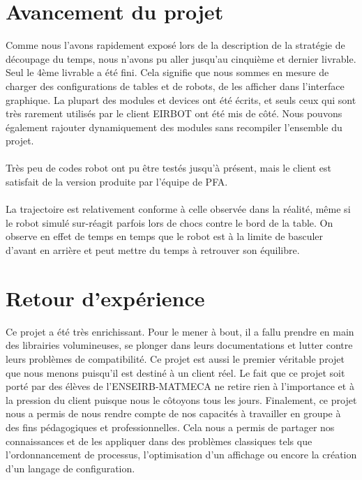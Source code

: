 \section{Avancement du projet}

Comme nous l'avons rapidement exposé lors de la description de la stratégie de découpage du temps, nous n'avons pu aller jusqu'au cinquième et dernier livrable. Seul le 4ème livrable a été fini. Cela signifie que nous sommes en mesure de charger des configurations de tables et de robots, de les afficher dans l'interface graphique. La plupart des modules et devices ont été écrits, et seuls ceux qui sont très rarement utilisés par le client EIRBOT ont été mis de côté.
Nous pouvons également rajouter dynamiquement des modules sans recompiler l'ensemble du projet.

\paragraph{}
Très peu de codes robot ont pu être testés jusqu'à présent, mais le client est satisfait de la version produite par l'équipe de PFA.

\paragraph{}
La trajectoire est relativement conforme à celle observée dans la réalité, même si le robot simulé sur-réagit parfois lors de chocs contre le bord de la table. On observe en effet de temps en temps que le robot est à la limite de basculer d'avant en arrière et peut mettre du temps à retrouver son équilibre.

\section{Retour d'expérience}

Ce projet a été très enrichissant. Pour le mener à bout, il a fallu prendre en main des librairies volumineuses, se plonger dans leurs documentations et lutter contre leurs problèmes de compatibilité. Ce projet est aussi le premier véritable projet que nous menons puisqu'il est destiné à un client réel. Le fait que ce projet soit porté par des élèves de l'ENSEIRB-MATMECA ne retire rien à l'importance et à la pression du client puisque nous le côtoyons tous les jours. Finalement, ce projet nous a permis de nous rendre compte de nos capacités à travailler en groupe à des fins pédagogiques et professionnelles. Cela nous a permis de partager nos connaissances et de les appliquer dans des problèmes classiques tels que l'ordonnancement de processus, l'optimisation d'un affichage ou encore la création d'un langage de configuration.

